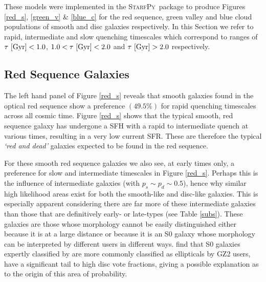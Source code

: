 \documentclass[useAMS,usenatbib]{mn2e}
\def\changed    {\color{titlecol} }
\def\starfpy {\textsc{StarfPy}}
\begin{document}

{\changed These models were implemented in the \starfpy ~package to produce Figures \ref{red_s}, \ref{green_v} \& \ref{blue_c} for the red sequence, green valley and blue cloud populations of smooth and disc galaxies respectively.} In this Section we refer to rapid, intermediate and slow quenching timescales which correspond to ranges of {\changed $\tau ~\rm{[Gyr]} < 1.0$, $1.0 < \tau ~\rm{[Gyr]} < 2.0$ and $\tau ~\rm{[Gyr]} > 2.0$} respectively. 



\subsection{Red Sequence Galaxies}\label{rs}


The left hand panel of Figure \ref{red_s} reveals that smooth galaxies found in the optical red sequence {\changed show a preference $(49.5\%)$} for rapid quenching timescales across all cosmic time. Figure \ref{red_s} shows that the typical smooth, red sequence galaxy has undergone a SFH with a rapid to intermediate quench at various times, resulting in a very low current SFR. These are therefore the typical \emph{`red and dead'} galaxies expected to be found in the red sequence. 

{\changed For these smooth red sequence galaxies we also see, at early times only, a preference for slow and intermediate timescales in Figure \ref{red_s}. Perhaps this is the influence of intermediate galaxies (with $p_s \sim p_d \sim 0.5$), hence why similar high likelihood areas exist for both the smooth-like and disc-like galaxies}. This is especially apparent considering there are far more of these intermediate galaxies than those that are definitively early- or late-types (see Table \ref{subs}). These galaxies are those whose morphology cannot be easily distinguished either because it is at a large distance or because it is an S0 galaxy whose morphology can be interpreted by different users in different ways. \citet{GZ2} find that S0 galaxies expertly classified by \citet{NA10} are more commonly classified as ellipticals by GZ2 users, have a significant tail to high disc vote fractions, giving a possible explanation as to the origin of this area of probability.
\end{document}
